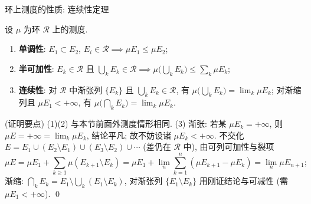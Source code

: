 \begin{frame}{环上测度的性质: 连续性定理}

\begin{thm}[环上测度的性质]
设 $\mu$ 为环 $\mathscr{R}$ 上的测度.
\begin{enumerate}
\item \textbf{单调性}: $E_1 \subset E_2$, $E_i \in \mathscr{R} \implies \mu E_1 \leqslant \mu E_2$;
\item \textbf{半可加性}: $E_k \in \mathscr{R}$ 且 $\bigcup_k E_k \in \mathscr{R} \implies \mu\big(\bigcup_k E_k\big) \leqslant \sum_k \mu E_k$;
\item \textbf{连续性}: 对 $\mathscr{R}$ 中\alert{渐张}列 $\{E_k\}$ 且 $\bigcup_k E_k \in \mathscr{R}$, 有 $\mu\big(\bigcup_k E_k\big) = \lim_k \mu E_k$; 对\alert{渐缩}列且 $\mu E_1 < +\infty$, 有 $\mu\big(\bigcap_k E_k\big) = \lim_k \mu E_k$.
\end{enumerate}
\end{thm}

\pause

\startproof[bg=yellow, fg=red](证明要点)
(1)(2) 与本节前面外测度情形相同. (3) 渐张: 若某 $\mu E_k = +\infty$, 则 $\mu E = +\infty = \lim_k \mu E_k$, 结论平凡; 故不妨设诸 $\mu E_k < +\infty$. 不交化 $E = E_1 \cup (E_2 \setminus E_1) \cup (E_3 \setminus E_2) \cup \cdots$ (差仍在 $\mathscr{R}$ 中), 由可列可加性与裂项
\[
\mu E = \mu E_1 + \sum_{k \geqslant 1} \mu(E_{k+1} \setminus E_k) = \mu E_1 + \lim_{n} \sum_{k=1}^{n} (\mu E_{k+1} - \mu E_k) = \lim_n \mu E_{n+1};
\]
渐缩: $\bigcap_k E_k = E_1 \setminus \bigcup_k (E_1 \setminus E_k)$, 对渐张列 $\{E_1 \setminus E_k\}$ 用刚证结论与可减性 (需 $\mu E_1 < +\infty$).
\qed

\end{frame}


